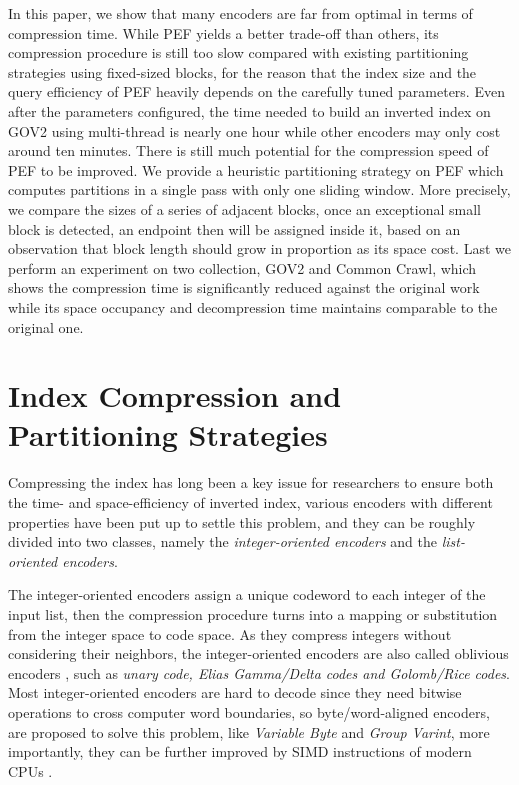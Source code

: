 \documentclass[runningheads,a4paper]{llncs}
\begin{document}
In this paper, we show that many encoders are far from optimal in terms of compression time.
While PEF yields a better trade-off than others, its compression procedure is still too slow compared with existing partitioning strategies using fixed-sized blocks, for the reason that the index size and the query efficiency of PEF heavily depends on the carefully tuned parameters.
Even after the parameters configured, the time needed to build an inverted index on GOV2 using multi-thread is nearly one hour while other encoders may only cost around ten minutes.
There is still much potential for the compression speed of PEF to be improved.
We provide a heuristic partitioning strategy on PEF which computes partitions in a single pass with only one sliding window.
More precisely, we compare the sizes of a series of adjacent blocks, once an exceptional small block is detected, an endpoint then will be assigned inside it, based on an observation that block length should grow in proportion as its space cost.
Last we perform an experiment on two collection, GOV2 and Common Crawl, which shows the compression time is significantly reduced against the original work while its space occupancy and decompression time maintains comparable to the original one.

\section{Index Compression and Partitioning Strategies}\label{sec:background}

Compressing the index has long been a key issue for researchers to ensure both the time- and space-efficiency of inverted index, various encoders with different properties have been put up to settle this problem, and they can be roughly divided into two classes, namely the \textit{integer-oriented encoders} and the \textit{list-oriented encoders}.

The integer-oriented encoders assign a unique codeword to each integer of the input list, then the compression procedure turns into a mapping or substitution from the integer space to code space.
As they compress integers without considering their neighbors, the integer-oriented encoders are also called oblivious encoders \cite{catena2014inverted}, such as \textit{unary code, Elias Gamma/Delta codes \emph{and} Golomb/Rice codes}.
Most integer-oriented encoders are hard to decode since they need bitwise operations to cross computer word boundaries, so byte/word-aligned encoders, are proposed to solve this problem, like \textit{Variable Byte} and \textit{Group Varint}, more importantly, they can be further improved by SIMD instructions of modern CPUs \cite{stepanov2011simd,trotman2014compression}.
\end{document}
